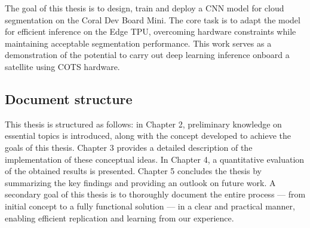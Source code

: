 {The goal of this thesis is to design, train and deploy a CNN model for cloud segmentation on the Coral Dev Board Mini. The core task is to adapt the model for efficient inference on the Edge TPU, overcoming hardware constraints while maintaining acceptable segmentation performance. This work serves as a demonstration of the potential to carry out deep learning inference onboard a satellite using COTS hardware.

\subsection{Document structure}

This thesis is structured as follows: in Chapter 2, preliminary knowledge on essential topics is introduced, along with the concept developed to achieve the goals of this thesis. Chapter 3 provides a detailed description of the implementation of these conceptual ideas. In Chapter 4, a quantitative evaluation of the obtained results is presented. Chapter 5 concludes the thesis by summarizing the key findings and providing an outlook on future work. A secondary goal of this thesis is to thoroughly document the entire process --- from initial concept to a fully functional solution –-- in a clear and practical manner, enabling efficient replication and learning from our experience.


}
